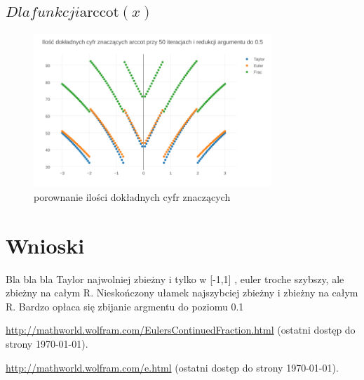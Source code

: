 \documentclass{article}
\begin{document}
\subsection{$Dla funkcji \textrm{arccot}(x)$}
	\FloatBarrier
	\begin{figure}[h]
		\includegraphics[width=0.8\textwidth,scale=0.5]{acot_znaczace.png}
		\caption{porownanie ilości dokładnych cyfr znaczących}
		\label{wskaźnik uwarunkowania}
	\end{figure}

	
\section{Wnioski}
Bla bla bla Taylor najwolniej zbieżny i tylko w [-1,1]
, euler troche szybszy, ale zbieżny na całym R.
Nieskończony ułamek najszybciej zbieżny i zbieżny na całym R.
Bardzo opłaca się zbijanie argmentu do poziomu 0.1


\begin{thebibliography}{9}
	\itemsep2pt
	 \url{http://mathworld.wolfram.com/EulersContinuedFraction.html}
	(ostatni dostęp do strony \today).
	
	 \url{http://mathworld.wolfram.com/e.html}
	(ostatni dostęp do strony \today).
	
\end{thebibliography}
\end{document}
